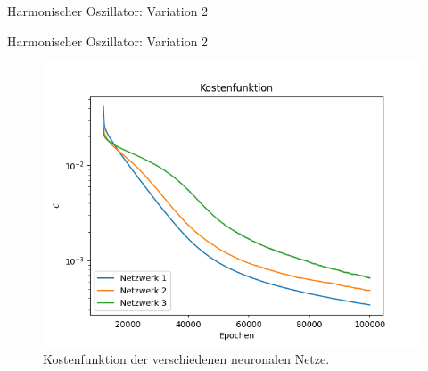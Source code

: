 \begin{frame}{Harmonischer Oszillator: Variation 2}
    \begin{table}
        \renewcommand{\arraystretch}{1.0}
        \centering
    \end{table}
\end{frame}

\begin{frame}{Harmonischer Oszillator: Variation 2}
    \begin{figure}
        \centering
        \includegraphics[scale=0.5]{images/harmonicoscillator_plots/harmonicoscillatorML_error__layers_var_avrloss}
        \caption{Kostenfunktion der verschiedenen neuronalen Netze.}
        \label{fig:harmonic-layers-variable-loss}
    \end{figure}
\end{frame}

